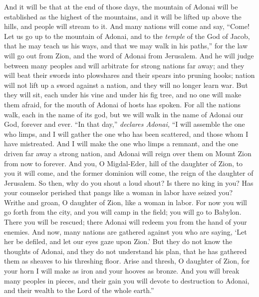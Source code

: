 \begin{biblechapter} %
 And it will be that at the end of those days, 
the mountain of Adonai 
will be established as the highest of the mountains, 
and it will be lifted up above the hills, 
and people will stream to it.
\verse And many nations will come and say, 
“Come! Let us go up to the mountain of Adonai, 
and to the \textit{temple} of the God of Jacob, 
that he may teach us his ways, 
and that we may walk in his paths,” 
for the law will go out from Zion, 
and the word of Adonai from Jerusalem.
\verse And he will judge between many peoples 
and will arbitrate for strong nations far away; 
and they will beat their swords into plowshares 
and their spears into pruning hooks; 
nation will not lift up a sword against a nation, 
and they will no longer learn war.
\verse But they will sit, each under his vine 
and under his fig tree, 
and no one will make them afraid, 
for the mouth of Adonai of hosts has spoken.
\verse For all the nations walk, 
each in the name of its god, 
but we will walk in the name of Adonai our God, 
forever and ever.
 “In that day,” \textit{declares Adonai,} 
“I will assemble the one who limps, 
and I will gather the one who has been scattered, 
and those whom I have mistreated.
\verse And I will make the one who limps a remnant, 
and the one driven far away a strong nation, 
and Adonai will reign over them on Mount Zion 
from now to forever.
\verse And you, O Migdal-Eder, 
hill of the daughter of Zion, 
to you it will come, 
and the former dominion will come, 
the reign of the daughter of Jerusalem.
\verse So then, why do you shout a loud shout? 
Is there no king in you? 
Has your counselor perished 
that pangs like a woman in labor have seized you?
\verse Writhe and groan, O daughter of Zion, 
like a woman in labor. 
For now you will go forth from the city, 
and you will camp in the field; 
you will go to Babylon. 
There you will be rescued; 
there Adonai will redeem you 
from the hand of your enemies.
\verse And now, many nations are gathered against you 
who are saying, ‘Let her be defiled, 
and let our eyes gaze upon Zion.’
\verse But they do not know the thoughts of Adonai, 
and they do not understand his plan, 
that he has gathered them as sheaves 
to his threshing floor.
\verse Arise and thresh, O daughter of Zion, 
for your horn I will make as iron 
and your hooves as bronze. 
And you will break many peoples in pieces, 
and their gain you will devote to destruction to Adonai, 
and their wealth to the Lord of the whole earth.”
\end{biblechapter}


